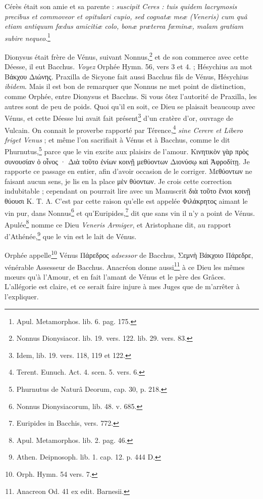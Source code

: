 \documentclass[a4paper, 11pt, oneside, polutonikogreek, french]{article}
\begin{document}
Cérès était son amie et sa parente : \emph{suscipit Ceres : tuis quidem lacrymosis precibus et commoveor et opitulari cupio, sed cognatæ meæ (Veneris) cum quâ etiam antiquum fœdus amicitiæ colo, bonæ præterea fœminæ, malam gratiam subire nequeo}.\footnote{Apul. Metamorphos. lib. 6. pag. 175.}

Dionysus était frère de Vénus, suivant Nonnus,\footnote{Nonnus Dionysiacor. lib. 19. vers. 122. lib. 29. vers. 83.} et de son commerce avec cette Déesse, il eut Bacchus. \emph{Voyez} Orphée Hymn. 56, vers 3 et 4. ; Hésychius au mot Βάκχου Διώνης. Praxilla de Sicyone fait aussi Bacchus fils de Vénus, Hésychius \emph{ibidem}. Mais il est bon de remarquer que Nonnus ne met point de distinction, comme Orphée, entre Dionysus et Bacchus. Si vous ôtez l'autorité de Praxilla, les autres sont de peu de poids. Quoi qu'il en soit, ce Dieu se plaisait beaucoup avec Vénus, et cette Déesse lui avait fait présent\footnote{Idem, lib. 19. vers. 118, 119 et 122.} d'un cratère d'or, ouvrage de Vulcain. On connait le proverbe rapporté par Térence,\footnote{Terent. Eunuch. Act. 4. scen. 5. vers. 6.} \emph{sine Cerere et Libero friget Venus} ; et même l'on sacrifiait à Vénus et à Bacchus, comme le dit Phurnutus,\footnote{Phurnutus de Naturâ Deorum, cap. 30, p. 218.} parce que le vin excite aux plaisirs de l'amour. Κινητικὸν γὰρ πρὸς συνουσίαν ὁ οἶνος · Διὰ τοῦτο ἐνίων κοινῇ μεθύοντων Διονύσῳ καὶ Ἀφροδίτῃ. Je rapporte ce passage en entier, afin d'avoir occasion de le corriger. Μεθύοντων ne faisant aucun sens, je lis en la place μὲν θύοντων. Je crois cette correction indubitable ; cependant on pourrait lire avec un Manuscrit διὰ τοῦτο ἔνιοι κοινῇ θύουσι Κ. Τ. Λ. C'est par cette raison qu'elle est appelée Φιλάκρητος aimant le vin pur, dans Nonnus\footnote{Nonnus Dionysiacorum, lib. 48. v. 685.} et qu'Euripides,\footnote{Euripides in Bacchis, vers. 772.} dit que sans vin il n'y a point de Vénus. Apulée\footnote{Apul. Metamorphos. lib. 2. pag. 46.} nomme ce Dieu \emph{Veneris Armiger}, et Aristophane dit, au rapport d'Athénée,\footnote{Athen. Deipnosoph. lib. 1. cap. 12. p. 444 D.} que le vin est le lait de Vénus.

Orphée appelle\footnote{Orph. Hymn. 54 vers. 7.} Vénus Πάρεδρος \emph{adsessor} de Bacchus, Σεμνὴ Βάκχοιο Πάρεδρε, vénérable Assesseur de Bacchus. Anacréon donne aussi\footnote{Anacreon Od. 41 ex edit. Barnesii.} à ce Dieu les mêmes mœurs qu'à l'Amour, et en fait l'amant de Vénus et le père des Grâces. L'allégorie est claire, et ce serait faire injure à mes Juges que de m'arrêter à l'expliquer.
\end{document}
